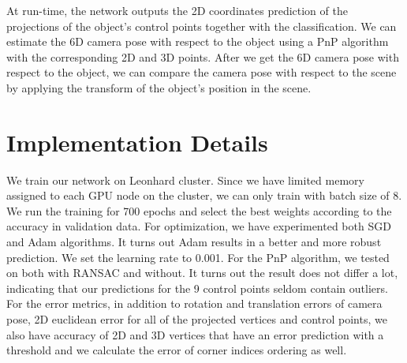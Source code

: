 At run-time, the network outputs the 2D coordinates prediction of the projections of the object's control points together with the classification. We can estimate the 6D camera pose with respect to the object using a PnP algorithm with the corresponding 2D and 3D points. After we get the 6D camera pose with respect to the object, we can compare the camera pose with respect to the scene by applying the transform of the object's position in the scene.

\section{Implementation Details}

We train our network on Leonhard cluster. Since we have limited memory assigned to each GPU node  on the cluster, we can only train with batch size of 8. We run the training for 700 epochs and select the best weights according to the accuracy in validation data. For optimization, we have experimented both SGD and Adam algorithms. It turns out Adam results in a better and more robust prediction. We set the learning rate to 0.001. For the PnP algorithm, we tested on both with RANSAC and without. It turns out the result does not differ a lot, indicating that our predictions for the 9 control points seldom contain outliers. For the error metrics, in addition to rotation and translation errors of camera pose, 2D euclidean error for all of the projected vertices and control points, we also have accuracy of 2D and 3D vertices that have an error prediction with a threshold and we calculate the error of corner indices ordering as well.

